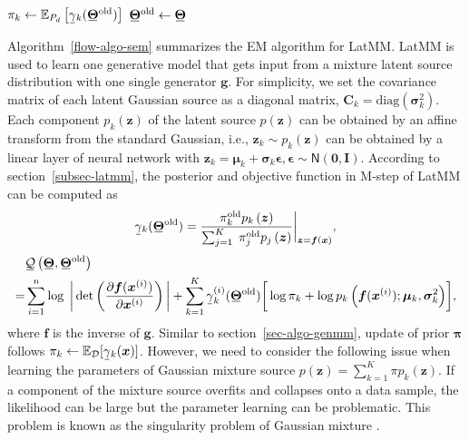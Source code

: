 \begin{algorithm}[t]
\begin{algorithmic}[1]
    \STATE $\pi_k \gets \EE_{P_d}\left[ \ubar{\gamma}_k(\ubar{\bm{\Theta}}^{\mathrm{old}}) \right]$%
    \STATE $\ubar{\bm{\Theta}}^{\mathrm{old}} \gets \ubar{\bm{\Theta}}$
    \ENDIF
    \ENDFOR
  \end{algorithmic}
\end{algorithm}


Algorithm~\ref{flow-algo-sem} summarizes the EM algorithm for LatMM.
LatMM is used to
learn one generative model that gets input from a mixture latent source
distribution with one single generator $\bm{g}$. For simplicity, we set
the covariance matrix of each latent Gaussian source as a diagonal
matrix, $\bm{C}_k = \mathrm{diag}(\bm{\sigma}_k^2) $. Each component $p_k(\bm{z})$ of
the latent source $p(\bm{z})$ can be obtained by an affine transform from
the standard Gaussian, {i.e.}, $\bm{z}_k \sim p_k(\bm{z})$ can be
obtained by a linear layer of neural network with $\bm{z}_k = \bm{\mu}_k
+ \bm{\sigma}_k \bm{\epsilon}, \bm{\epsilon} \sim \mathsf{N}(\bm{0}, \bm{I})$.
According to section~\ref{subsec-latmm}, the posterior and objective function in M-step of LatMM can be computed as
\begin{align}\label{em-latmm-gamma}
  \ubar{\gamma}_k(\ubar{\bm{\Theta}}^{\mathrm{old}}) = \frac{\pi_k^{\mathrm{old}} p_k\left(\bm{z}\right)}{\sum_{j=1}^K\;\pi_j^{\mathrm{old}} p_j\left(\bm{z}\right)}\bigg|_{\bm{z}=\bm{f}(\bm{x})},
\end{align}
\begin{align}\label{eq-latmm-obj}
  &\ubar{\Qq}\left( \ubar{\bm{\Theta}},\ubar{\bm{\Theta}}^{\mathrm{old}}\right) \nonumber \\
    =&\sum_{i=1}^n \log\;\bigg|\det\left(
    \pd{\bm{f}(\bm{x}^{(i)})}{\bm{x}^{(i)}} \right)\bigg| 
  + \sum_{k=1}^{K}\ubar{\gamma}_k^{(i)}(\ubar{\bm{\Theta}}^{\mathrm{old}})\bigg[ \log{\pi_k}
    +\log{p_k\left(\bm{f}(\bm{x}^{(i)}); \bm{\mu}_k, \bm{\sigma}_k^2\right)}\bigg], 
\end{align}
where $\bm{f}$ is the inverse of $\bm{g}$.
Similar to section~\ref{sec-algo-genmm}, update of prior $\bm{\pi}$
follows $\pi_k \leftarrow \EE_{\Dd}[ \ubar{\gamma}_k(\bm{x})
]$. However, we need to consider the following issue when learning the parameters of
Gaussian mixture source $p(\bm{z}) = \sum_{k=1}^K \pi p_k(\bm{z})$. If a component of the mixture source overfits and collapses onto a data sample, the likelihood can be large but the parameter learning can be problematic. This problem is known as the singularity problem of Gaussian mixture \cite{Bishop:2006:PRM:1162264}.
